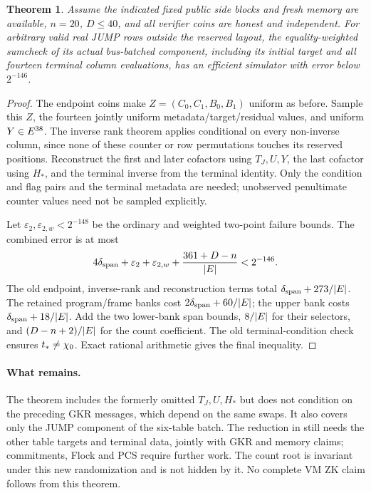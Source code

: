 \documentclass[11pt]{article}
\newtheorem{theorem}{Theorem}
\begin{document}
\begin{theorem}
Assume the indicated fixed public side blocks and fresh memory are available, $n=20$, $D\le40$, and all verifier coins are honest and independent. For arbitrary valid real JUMP rows outside the reserved layout, the equality-weighted sumcheck of its actual bus-batched component, including its initial target and all fourteen terminal column evaluations, has an efficient simulator with error below $2^{-146}$.
\end{theorem}
\begin{proof}
The endpoint coins make $Z=(C_0,C_1,B_0,B_1)$ uniform as before. Sample this $Z$, the fourteen jointly uniform metadata/target/residual values, and uniform $Y\in E^{38}$. The inverse rank theorem applies conditional on every non-inverse column, since none of these counter or row permutations touches its reserved positions. Reconstruct the first and later cofactors using $T_J,U,Y$, the last cofactor using $H_*$, and the terminal inverse from the terminal identity. Only the condition and flag pairs and the terminal metadata are needed; unobserved penultimate counter values need not be sampled explicitly.

Let $\varepsilon_2,\varepsilon_{2,w}<2^{-148}$ be the ordinary and weighted two-point failure bounds. The combined error is at most
\[
 4\delta_{\mathrm{span}}+\varepsilon_2+\varepsilon_{2,w}
       +\frac{361+D-n}{|E|}<2^{-146}.
\]
The old endpoint, inverse-rank and reconstruction terms total $\delta_{\mathrm{span}}+273/|E|$. The retained program/frame banks cost $2\delta_{\mathrm{span}}+60/|E|$; the upper bank costs $\delta_{\mathrm{span}}+18/|E|$. Add the two lower-bank span bounds, $8/|E|$ for their selectors, and $(D-n+2)/|E|$ for the count coefficient. The old terminal-condition check ensures $t_*\ne\chi_0$. Exact rational arithmetic gives the final inequality.
\end{proof}

\paragraph{What remains.} The theorem includes the formerly omitted $T_J,U,H_*$ but does not condition on the preceding GKR messages, which depend on the same swaps. It also covers only the JUMP component of the six-table batch. The reduction in  still needs the other table targets and terminal data, jointly with GKR and memory claims; commitments, Flock and PCS require further work. The count root is invariant under this new randomization and is not hidden by it. No complete VM ZK claim follows from this theorem.
\end{document}
